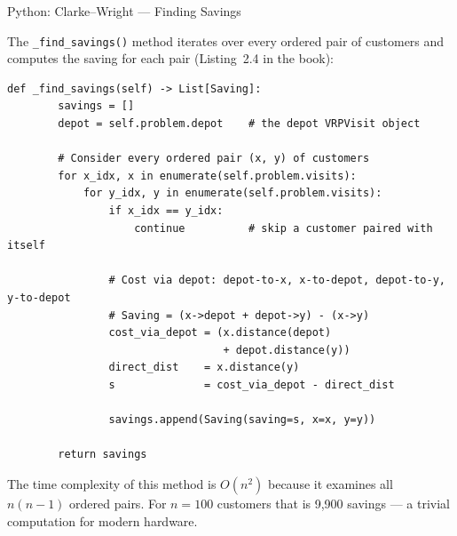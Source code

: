 \documentclass[aspectratio=169,10pt]{beamer}
\begin{document}
\begin{frame}[fragile]{Python: Clarke--Wright --- Finding Savings}

  The \texttt{\_find\_savings()} method iterates over every ordered pair of
  customers and computes the saving for each pair (Listing~2.4 in the book):

\begin{lstlisting}[caption={Clarke--Wright: computing all pairwise savings}]
    def _find_savings(self) -> List[Saving]:
        savings = []
        depot = self.problem.depot    # the depot VRPVisit object

        # Consider every ordered pair (x, y) of customers
        for x_idx, x in enumerate(self.problem.visits):
            for y_idx, y in enumerate(self.problem.visits):
                if x_idx == y_idx:
                    continue          # skip a customer paired with itself

                # Cost via depot: depot-to-x, x-to-depot, depot-to-y, y-to-depot
                # Saving = (x->depot + depot->y) - (x->y)
                cost_via_depot = (x.distance(depot)
                                  + depot.distance(y))
                direct_dist    = x.distance(y)
                s              = cost_via_depot - direct_dist

                savings.append(Saving(saving=s, x=x, y=y))

        return savings
\end{lstlisting}

  \medskip
  The time complexity of this method is $O(n^2)$ because it examines all
  $n(n-1)$ ordered pairs.  For $n=100$ customers that is 9,900 savings --- a
  trivial computation for modern hardware.

\end{frame}
\end{document}
